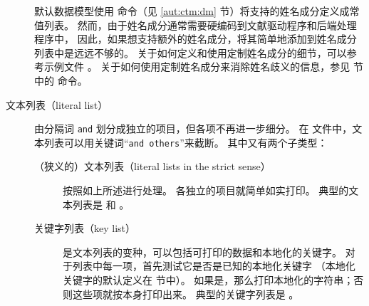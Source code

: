 \begin{description}

默认数据模型使用  命令（见 \ref{aut:ctm:dm} 节）将支持的姓名成分定义成常值列表。
然而，由于姓名成分通常需要硬编码到文献驱动程序和后端处理程序中，
因此，如果想支持额外的姓名成分，将其简单地添加到姓名成分列表中是远远不够的。
关于如何定义和使用定制姓名成分的细节，可以参考示例文件 。
关于如何使用定制姓名成分来消除姓名歧义的信息，参见  节中的  命令。

\item[文本列表（literal list）] 由分隔词 \texttt{and} 划分成独立的项目，但各项不再进一步细分。
在  文件中，文本列表可以用关键词“\texttt{and others}”来截断。
其中又有两个子类型：

\begin{description}

\item[（狭义的）文本列表（literal lists in the strict sense）] 按照如上所述进行处理。
各独立的项目就简单如实打印。
典型的文本列表是  和 。

\item[关键字列表（key list）]  是文本列表的变种，可以包括可打印的数据和本地化的关键字。
对于列表中每一项，首先测试它是否是已知的本地化关键字
（本地化关键字的默认定义在  节中）。
如果是，那么打印本地化的字符串；否则这些项就按本身打印出来。
典型的关键字列表是 。

\end{description}
\end{description}

